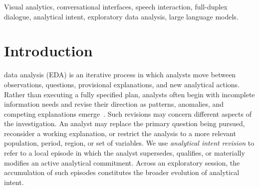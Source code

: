 \documentclass[journal]{IEEEtran}
\begin{document}
\begin{abstract}
Exploratory data analysis is iterative: new observations may lead analysts to redirect questions, revise provisional explanations, or refine the data scope under investigation. Existing speech- and language-driven visual analytics systems generally support such changes only at discrete turn boundaries. Full-duplex interaction enables users to redirect an analysis while the assistant is still speaking, but stopping audio alone is insufficient when the superseded response may also have initiated actions that modify a persistent dashboard. We present \textbf{VerbalVis}, a full-duplex conversational visual analytics system that coordinates spoken output, schema-grounded tool execution, and dashboard state during mid-response redirection. Drawing on prior work in sensemaking and exploratory analysis, we use three non-exhaustive and potentially overlapping constructs---\emph{Analytical Goal Shift}, \emph{Working-Hypothesis Revision}, and \emph{Analytical Scope Refinement}---to characterize revision episodes. A lightweight formative study refined their operational boundaries and informed requirements for cancellation, state preservation, and visible feedback. VerbalVis truncates obsolete speech, invalidates superseded tool actions, discards stale results, and replans against the latest committed dashboard state. We evaluate it through an illustrative scenario and an exploratory within-subjects comparison of full-duplex and turn-based interaction.
\end{abstract}


\begin{IEEEkeywords}
Visual analytics, conversational interfaces, speech interaction, full-duplex dialogue, analytical intent, exploratory data analysis, large language models.
\end{IEEEkeywords}



\section{Introduction}
\label{sec:intro}

 data analysis (EDA) is an iterative process in
which analysts move between observations, questions, provisional
explanations, and new analytical actions. Rather than executing a fully
specified plan, analysts often begin with incomplete information needs and
revise their direction as patterns, anomalies, and competing explanations
emerge~\cite{russell1993cost,pirolli2005sensemaking,
sacha2014knowledge,battle2019characterizing}. Such revisions may concern
different aspects of the investigation. An analyst may replace the primary
question being pursued, reconsider a working explanation, or restrict the
analysis to a more relevant population, period, region, or set of variables.
We use \emph{analytical intent revision} to refer to a local episode in which
the analyst supersedes, qualifies, or materially modifies an active analytical
commitment. Across an exploratory session, the accumulation of such episodes
constitutes the broader evolution of analytical intent.
\end{document}

